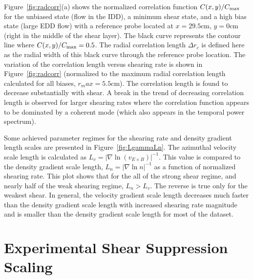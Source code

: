 \documentclass[aip,pop,amsmath,amssymb,peprint,superscriptaddress]{revtex4-1} %
\begin{document}
Figure~\ref{fig:radcorr}(a) shows the normalized correlation function $C(x,y)/C_{\rm max}$ for the unbiased state (flow in the IDD), a minimum shear state, and a high bias state (large EDD flow) with a reference probe located at $x=29.5$cm, $y=0$cm (right in the middle of the shear layer). The black curve represents the contour line where $C(x,y)/C_{\rm max} = 0.5$. The radial correlation length $\Delta r_{c}$ is defined here as the radial width of this black curve through the reference probe location.   The variation of the correlation length versus shearing rate is shown in Figure~\ref{fig:radcorr} (normalized to the maximum radial correlation length calculated for all biases, $r_max = 5.5$cm).
The correlation length is found to decrease substantially with shear.  A break in the trend of decreasing correlation length is observed for larger shearing rates where the correlation function appears to be dominated by a coherent mode (which also appears in the temporal power spectrum).

Some achieved parameter regimes for the shearing rate and density
gradient length scales are presented in Figure~\ref{fig:LgammaLn}. The
azimuthal velocity scale length is calculated as $L_{v} = |\nabla
\ln(v_{E\times B})|^{-1}$. This value is compared to the density
gradient scale length, $L_{n} = |\nabla \ln{n}|^{-1}$ as a function of
normalized shearing rate. This plot shows that for the all of the
strong shear regime, and nearly half of the weak shearing regime,
$L_{n} > L_{v}$. The reverse is true only for the weakest shear. In
general, the velocity gradient scale length decreases much faster than the density gradient scale length with increased shearing rate magnitude and is smaller than the density gradient scale length for most of the dataset.

\section{Experimental Shear Suppression Scaling}
\end{document}
